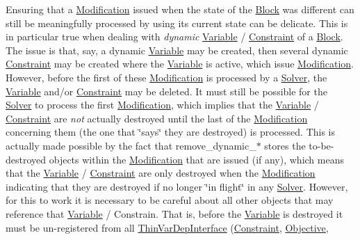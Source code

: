 \begin{DoxyEnumerate}
\item Ensuring that a \mbox{\hyperlink{class_s_m_spp__di__unipi__it_1_1_modification}{Modification}} issued when the state of the \mbox{\hyperlink{class_s_m_spp__di__unipi__it_1_1_block}{Block}} was different can still be meaningfully processed by using its current state can be delicate. This is in particular true when dealing with {\itshape dynamic} \mbox{\hyperlink{class_s_m_spp__di__unipi__it_1_1_variable}{Variable}} / \mbox{\hyperlink{class_s_m_spp__di__unipi__it_1_1_constraint}{Constraint}} of a \mbox{\hyperlink{class_s_m_spp__di__unipi__it_1_1_block}{Block}}. The issue is that, say, a dynamic \mbox{\hyperlink{class_s_m_spp__di__unipi__it_1_1_variable}{Variable}} may be created, then several dynamic \mbox{\hyperlink{class_s_m_spp__di__unipi__it_1_1_constraint}{Constraint}} may be created where the \mbox{\hyperlink{class_s_m_spp__di__unipi__it_1_1_variable}{Variable}} is active, which issue \mbox{\hyperlink{class_s_m_spp__di__unipi__it_1_1_modification}{Modification}}. However, before the first of these \mbox{\hyperlink{class_s_m_spp__di__unipi__it_1_1_modification}{Modification}} is processed by a \mbox{\hyperlink{class_s_m_spp__di__unipi__it_1_1_solver}{Solver}}, the \mbox{\hyperlink{class_s_m_spp__di__unipi__it_1_1_variable}{Variable}} and/or \mbox{\hyperlink{class_s_m_spp__di__unipi__it_1_1_constraint}{Constraint}} may be deleted. It must still be possible for the \mbox{\hyperlink{class_s_m_spp__di__unipi__it_1_1_solver}{Solver}} to process the first \mbox{\hyperlink{class_s_m_spp__di__unipi__it_1_1_modification}{Modification}}, which implies that the \mbox{\hyperlink{class_s_m_spp__di__unipi__it_1_1_variable}{Variable}} / \mbox{\hyperlink{class_s_m_spp__di__unipi__it_1_1_constraint}{Constraint}} are {\itshape not} actually destroyed until the last of the \mbox{\hyperlink{class_s_m_spp__di__unipi__it_1_1_modification}{Modification}} concerning them (the one that \char`\"{}says\char`\"{} they are destroyed) is processed. This is actually made possible by the fact that remove\+\_\+dynamic\+\_\+$\ast$ stores the to-\/be-\/destroyed objects within the \mbox{\hyperlink{class_s_m_spp__di__unipi__it_1_1_modification}{Modification}} that are issued (if any), which means that the \mbox{\hyperlink{class_s_m_spp__di__unipi__it_1_1_variable}{Variable}} / \mbox{\hyperlink{class_s_m_spp__di__unipi__it_1_1_constraint}{Constraint}} are only destroyed when the \mbox{\hyperlink{class_s_m_spp__di__unipi__it_1_1_modification}{Modification}} indicating that they are destroyed if no longer \char`\"{}in flight\char`\"{} in any \mbox{\hyperlink{class_s_m_spp__di__unipi__it_1_1_solver}{Solver}}. However, for this to work it is necessary to be careful about all other objects that may reference that \mbox{\hyperlink{class_s_m_spp__di__unipi__it_1_1_variable}{Variable}} / Constrain. That is, before the \mbox{\hyperlink{class_s_m_spp__di__unipi__it_1_1_variable}{Variable}} is destroyed it must be un-\/registered from all \mbox{\hyperlink{class_s_m_spp__di__unipi__it_1_1_thin_var_dep_interface}{Thin\+Var\+Dep\+Interface}} (\mbox{\hyperlink{class_s_m_spp__di__unipi__it_1_1_constraint}{Constraint}}, \mbox{\hyperlink{class_s_m_spp__di__unipi__it_1_1_objective}{Objective}}, 
\end{DoxyEnumerate}

